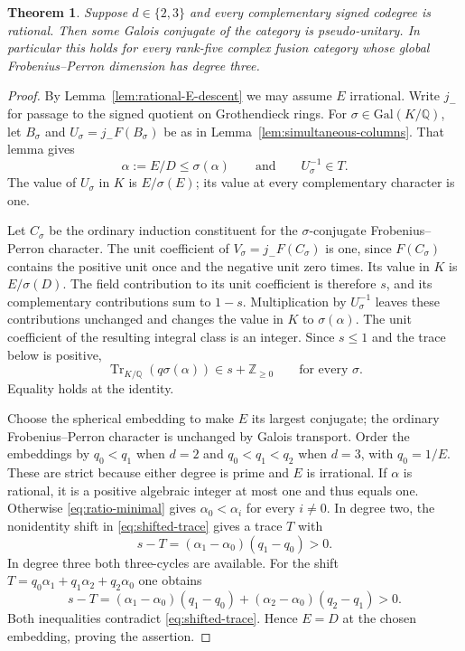 \documentclass[11pt,a4paper]{article}
\newtheorem{theorem}{Theorem}[section]
\numberwithin{equation}{section}
\begin{document}
\begin{theorem}\label{thm:cubic-full}
Suppose $d\in\{2,3\}$ and every complementary signed codegree is rational.
Then some Galois conjugate of the category is pseudo-unitary.
In particular this holds for every rank-five complex fusion category
whose global Frobenius--Perron dimension has degree three.
\end{theorem}
\begin{proof}
By Lemma~\ref{lem:rational-E-descent} we may assume $E$ irrational.
Write $j_-$ for passage to the signed quotient on Grothendieck rings.
For $\sigma\in\mathrm{Gal}(K/\mathbb Q)$, let $B_\sigma$ and
$U_\sigma=j_-F(B_\sigma)$ be as in
Lemma~\ref{lem:simultaneous-columns}. That lemma gives
\begin{equation}\label{eq:ratio-minimal}
 \alpha:=E/D\le\sigma(\alpha)
 \qquad\text{and}\qquad U_\sigma^{-1}\in T.
\end{equation}
The value of $U_\sigma$ in $K$ is $E/\sigma(E)$; its value at every
complementary character is one.

Let $C_\sigma$ be the ordinary induction constituent for the
$\sigma$-conjugate Frobenius--Perron character. The unit coefficient
of $V_\sigma=j_-F(C_\sigma)$ is one, since $F(C_\sigma)$ contains
the positive unit once and the negative unit zero times. Its value in
$K$ is $E/\sigma(D)$. The field contribution to its unit coefficient
is therefore $s$, and its complementary contributions sum to $1-s$.
Multiplication by $U_\sigma^{-1}$ leaves these contributions unchanged
and changes the value in $K$ to $\sigma(\alpha)$. The unit coefficient
of the resulting integral class is an integer. Since $s\le1$ and the
trace below is positive,
\begin{equation}\label{eq:shifted-trace}
  \operatorname{Tr}_{K/\mathbb Q}(q\sigma(\alpha))
        \in s+\mathbb Z_{\ge0}
       \qquad\text{for every }\sigma .
\end{equation}
Equality holds at the identity.

Choose the spherical embedding to make $E$ its largest conjugate; the
ordinary Frobenius--Perron character is unchanged by Galois transport.
Order the embeddings by $q_0<q_1$ when $d=2$ and $q_0<q_1<q_2$ when
$d=3$, with $q_0=1/E$. These are strict because either degree is
prime and $E$ is irrational. If $\alpha$ is rational, it is a positive
algebraic integer at most one and thus equals one. Otherwise \eqref{eq:ratio-minimal} gives
$\alpha_0<\alpha_i$ for every $i\ne0$. In degree two, the nonidentity
shift in \eqref{eq:shifted-trace} gives a trace $T$ with
\[
 s-T=(\alpha_1-\alpha_0)(q_1-q_0)>0 .
\]
In degree three both three-cycles are available. For the shift
$T=q_0\alpha_1+q_1\alpha_2+q_2\alpha_0$ one obtains
\[
 s-T=(\alpha_1-\alpha_0)(q_1-q_0)
       +(\alpha_2-\alpha_0)(q_2-q_1)>0 .
\]
Both inequalities contradict \eqref{eq:shifted-trace}. Hence $E=D$ at
the chosen embedding, proving the assertion.


\end{proof}
\end{document}

